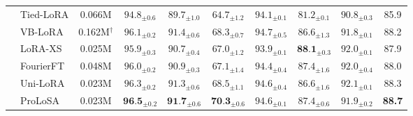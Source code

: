 \begin{table}[t]
{\begin{tabular}{clcccccccc}
& Tied-LoRA & 0.066M & $94.8_{\pm 0.6}$ & $89.7_{\pm 1.0}$ & $64.7_{\pm 1.2}$ & $94.1_{\pm 0.1}$ & $81.2_{\pm 0.1}$ & $90.8_{\pm 0.3}$ & 85.9 \\
& VB-LoRA & 0.162M$^\dagger$ & $96.1_{\pm 0.2}$ & $91.4_{\pm 0.6}$ & $68.3_{\pm 0.7}$ & $94.7_{\pm 0.5}$ & $86.6_{\pm 1.3}$ & $91.8_{\pm 0.1}$ & 88.2 \\
& LoRA-XS & 0.025M & $95.9_{\pm 0.3}$ & $90.7_{\pm 0.4}$ & $67.0_{\pm 1.2}$ & $93.9_{\pm 0.1}$ & $\textbf{88.1}_{\pm 0.3}$ & $92.0_{\pm 0.1}$ & 87.9 \\
& FourierFT & 0.048M & $96.0_{\pm 0.2}$ & $90.9_{\pm 0.3}$ & $67.1_{\pm 1.4}$ & $94.4_{\pm 0.4}$ & $87.4_{\pm 1.6}$ & $92.0_{\pm 0.4}$ & 88.0 \\
& Uni-LoRA & 0.023M & $96.3_{\pm 0.2}$ & $91.3_{\pm 0.6}$ & $68.5_{\pm 1.1}$ & $94.6_{\pm 0.4}$ & $86.6_{\pm 1.6}$ & $92.1_{\pm 0.1}$ & $88.3$ \\
& ProLoSA & 0.023M & $\textbf{96.5}_{\pm 0.2}$ & $\textbf{91.7}_{\pm 0.6}$ & $\textbf{70.3}_{\pm 0.6}$ & $94.6_{\pm 0.1}$ & $87.4_{\pm 0.6}$ & $91.9_{\pm 0.2}$ & \textbf{88.7} \\
\bottomrule
\end{tabular}%
}
\end{table}



